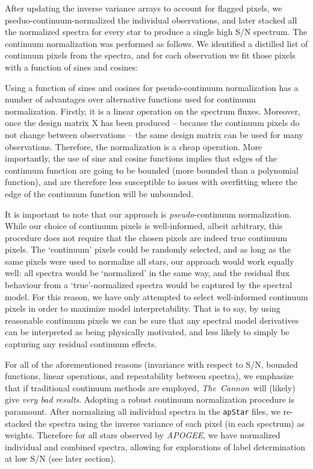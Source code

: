 \documentclass[12pt,preprint]{aastex}
\newcommand{\project}[1]{\textsl{#1}}
\newcommand{\TheCannon}{\project{The~Cannon}}
\newcommand{\acronym}[1]{{\small{#1}}}
\newcommand{\apogee}{\project{\acronym{APOGEE}}}
\begin{document}
After updating the inverse variance arrays to account for flagged pixels, we
pseduo-continuum-normalized the individual observations, and later stacked all the
normalized spectra for every star to produce a single high S/N spectrum.
The continuum normalization was performed as follows.  We identified a distilled
list of continuum pixels from the spectra, and for each observation we fit those
pixels with a function of sines and cosines:



Using a function of sines and cosines for pseudo-continuum normalization has a
number of advantages over alternative functions used for continuum normalization.
Firstly, it is a linear operation on the spectrum fluxes.  Moreover, once the
design matrix X has been produced -- because the continuum pixels do not change
between observations -- the same design matrix can be used for many observations.
Therefore, the normalization is a cheap operation.  More importantly, the use of
sine and cosine functions implies that edges of the continuum function are going
to be bounded (more bounded than a polynomial function), and are therefore less
susceptible to issues with overfitting where the edge of the continuum function
will be unbounded.


It is important to note that our approach is \emph{pseudo}-continuum normalization.
While our choice of continuum pixels is well-informed, albeit arbitrary, this
procedure does not require that the chosen pixels are indeed true continuum
pixels.  The `continuum' pixels could be randomly selected, and as long as the
same pixels were used to normalize all stars, our approach would work equally
well: all spectra would be `normalized' in the same way, and the residual flux
behaviour from a `true'-normalized spectra would be captured by the spectral
model.  For this reason, we have only attempted to select well-informed 
continuum pixels in order to maximize model interpretability.  That is to say,
by using reasonable continuum pixels we can be sure that any spectral model
derivatives can be interpreted as being physically motivated, and less likely to
simply be capturing any residual continuum effects.


For all of the aforementioned reasons (invariance with respect to S/N, bounded
functions, linear operations, and repeatability between spectra), we emphasize
that if traditional continuum methods are employed, \TheCannon\ will (likely) 
give \emph{very bad results}.  Adopting a robust continuum normalization 
procedure is paramount.  After normalizing all individual spectra in the
\texttt{apStar} files, we re-stacked the spectra using the inverse variance of
each pixel (in each spectrum) as weights.  Therefore for all stars observed by
\apogee, we have normalized individual and combined spectra, allowing for 
explorations of label determination at low S/N (see later section).
\end{document}
